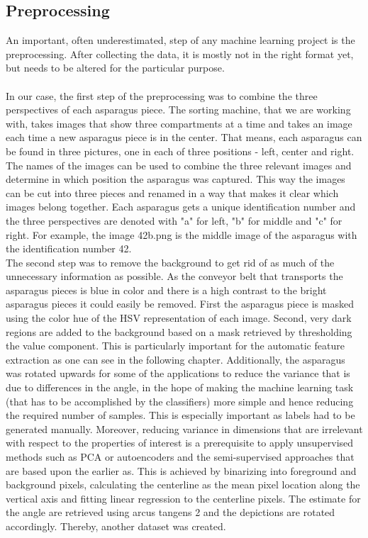 \subsection{Preprocessing}

An important, often underestimated, step of any machine learning project is the preprocessing. After collecting the data, it is mostly not in the right format yet, but needs to be altered for the particular purpose. \\
\\
In our case, the first step of the preprocessing was to combine the three perspectives of each asparagus piece. The sorting machine, that we are working with, takes images that show three compartments at a time and takes an image each time a new asparagus piece is in the center. That means, each asparagus can be found in three pictures, one in each of three positions - left, center and right. The names of the images can be used to combine the three relevant images and determine in which position the asparagus was captured. This way the images can be cut into three pieces and renamed in a way that makes it clear which images belong together. Each asparagus gets a unique identification number and the three perspectives are denoted with "a" for left, "b" for middle and "c" for right. For example, the image 42\textunderscore b.png is the middle image of the asparagus with the identification number 42. \\
The second step was to remove the background to get rid of as much of the unnecessary information as possible. As the conveyor belt that transports the asparagus pieces is blue in color and there is a high contrast to the bright asparagus pieces it could easily be removed. First the asparagus piece is masked using the color hue of the HSV representation of each image. Second, very dark regions are added to the background based on a mask retrieved by thresholding the value component. This is particularly important for the automatic feature extraction as one can see in the following chapter. Additionally, the asparagus was rotated upwards for some of the applications to reduce the variance that is due to differences in the angle, in the hope of making the machine learning task (that has to be accomplished by the classifiers) more simple and hence reducing the required number of samples. This is especially important as labels had to be generated manually. Moreover, reducing variance in dimensions that are irrelevant with respect to the properties of interest is a prerequisite to apply unsupervised methods such as PCA or autoencoders and the semi-supervised approaches that are based upon the earlier as. This is achieved by binarizing into foreground and background pixels, calculating the centerline as the mean pixel location along the vertical axis and fitting linear regression to the centerline pixels. The estimate for the angle are retrieved using arcus tangens 2 and the depictions are rotated accordingly. Thereby, another dataset was created. \\
